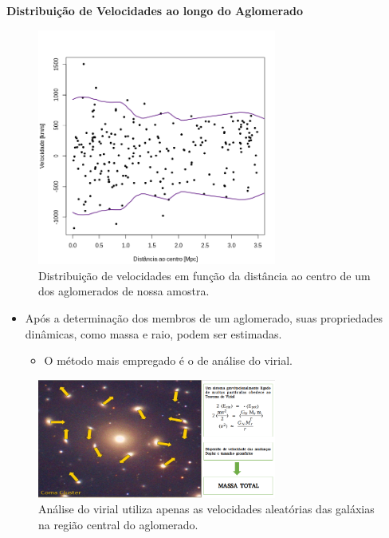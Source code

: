 \documentclass[xcolor=dvipsnames,10pt]{beamer}
\begin{document}
\begin{frame}{\textbf{Distribuição de Velocidades ao longo do Aglomerado}}
  \begin{figure}[!htbp] %
    \begin{center}
    \includegraphics[height=0.6\textheight,width=0.7\textwidth]{10043}%
    \caption{\scriptsize{Distribuição de velocidades em função da distância ao centro de um dos aglomerados de nossa amostra.}}
    \label{fig1}%
    \end{center}
  \end{figure} 
\end{frame}

\begin{frame}
  \begin{itemize}
    \item Após a determinação dos membros de um aglomerado, suas propriedades dinâmicas, como massa e raio, podem ser estimadas.
    \begin{itemize}
      \item O método mais empregado é o de análise do virial.
    \end{itemize} 
  \end{itemize}
  \begin{figure}[!htbp] %
    \begin{center}
    \includegraphics[height=0.5\textheight,width=0.7\textwidth]{resultados/virial.png}%
    \caption{\scriptsize{Análise do virial utiliza apenas as velocidades aleatórias das galáxias na região central do aglomerado.}}
    \end{center}
  \end{figure} 
\end{frame}
\end{document}
